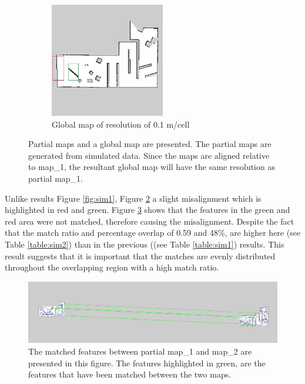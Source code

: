 \begin{figure}[H]
\begin{subfigure}{0.5\textwidth}
\centering
\includegraphics[width=0.9\linewidth, height=5cm]{figs/simulation_results/b/final_map_marked.jpg}
\caption{Global map of resolution of 0.1 m/cell}
\label{fig:sim23}
\end{subfigure}
\caption{Partial maps and a global map are presented. The partial maps are generated from simulated data. Since the maps are aligned relative to map\_1, the resultant global map will have the same resolution as partial map\_1.}
\label{fig:sim2}
\end{figure}


Unlike results Figure \ref{fig:sim1}, Figure \ref{fig:sim2} a slight misalignment which is highlighted in red and green. Figure \ref{fig:sim2match1} shows that the features in the green and red area were not matched, therefore causing the misalignment. Despite the fact that the match ratio and percentage overlap of 0.59 and 48\%, are higher here (see Table \ref{table:sim2}) than in the previous ((see Table \ref{table:sim1}) results. This result suggests that it is important that the matches are evenly distributed throughout the overlapping region with a high match ratio. 

\begin{figure}[H]
    \centering
    \includegraphics[width=1\textwidth]{figs/simulation_results/b/matchesPartialMap1Map2.jpg}
    \caption{The matched features between partial map\_1 and map\_2 are presented in this figure. The features highlighted in green, are the features that have been matched between the two maps.}
    \label{fig:sim2match1}
\end{figure} 



